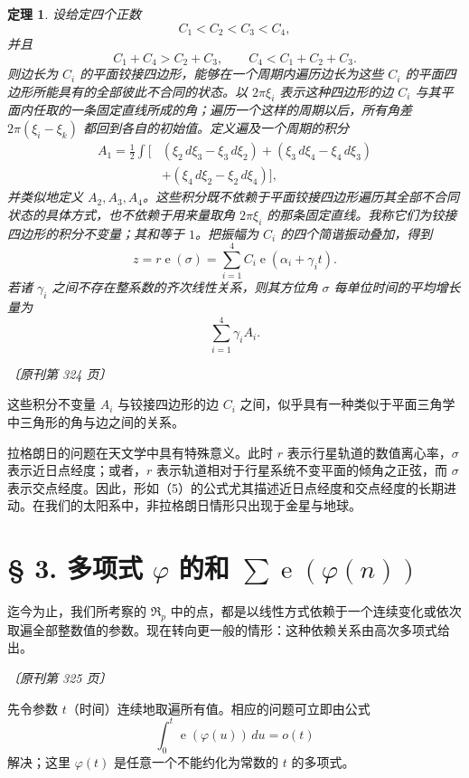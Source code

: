 \documentclass[UTF8,11pt,a4paper,fontset=none]{ctexart}
\theoremstyle{weylthm}
\newtheorem{theorem}{定理}
\newcommand{\e}{\operatorname{e}}
\newcommand{\origpage}[1]{%
  \par\vspace{0.7em}\noindent\hfill{\small\itshape〔原刊第 #1 页〕}\par\vspace{0.25em}}
\begin{document}
\begin{theorem}
设给定四个正数
\[
 C_1<C_2<C_3<C_4,
\]
并且
\[
 C_1+C_4>C_2+C_3,
 \qquad
 C_4<C_1+C_2+C_3.
\]
则边长为 \(C_i\) 的平面铰接四边形，能够在一个周期内遍历边长为这些
\(C_i\) 的平面四边形所能具有的全部彼此不合同的状态。以
\(2\pi\xi_i\) 表示这种四边形的边 \(C_i\) 与其平面内任取的一条固定直线所成的角；遍历一个这样的周期以后，所有角差
\(2\pi(\xi_i-\xi_k)\) 都回到各自的初始值。定义遍及一个周期的积分
\[
\begin{aligned}
 A_1=\frac12\int\bigl[&
   (\xi_2\,d\xi_3-\xi_3\,d\xi_2)
  +(\xi_3\,d\xi_4-\xi_4\,d\xi_3)\\
 &+(\xi_4\,d\xi_2-\xi_2\,d\xi_4)
 \bigr],
\end{aligned}
\]
并类似地定义 \(A_2,A_3,A_4\)。这些积分既不依赖于平面铰接四边形遍历其全部不合同状态的具体方式，也不依赖于用来量取角
\(2\pi\xi_i\) 的那条固定直线。我称它们为铰接四边形的\emph{积分不变量}；其和等于 \(1\)。把振幅为 \(C_i\) 的四个简谐振动叠加，得到
\[
 z=r\e(\sigma)=\sum_{i=1}^{4}C_i\e(\alpha_i+\gamma_i t).
\]
若诸 \(\gamma_i\) 之间不存在整系数的齐次线性关系，则其方位角 \(\sigma\) 每单位时间的平均增长量为
\[
 \sum_{i=1}^{4}\gamma_iA_i.
\]
\end{theorem}

\origpage{324}

这些积分不变量 \(A_i\) 与铰接四边形的边 \(C_i\) 之间，似乎具有一种类似于平面三角学中三角形的角与边之间的关系。

拉格朗日的问题在天文学中具有特殊意义。此时 \(r\) 表示行星轨道的数值离心率，\(\sigma\) 表示近日点经度；或者，\(r\) 表示轨道相对于行星系统不变平面的倾角之正弦，而 \(\sigma\) 表示交点经度。因此，形如（5）的公式尤其描述近日点经度和交点经度的长期进动。在我们的太阳系中，非拉格朗日情形只出现于金星与地球。

\section*{§ 3. 多项式 \(\varphi\) 的和 \(\sum \e(\varphi(n))\)}

迄今为止，我们所考察的 \(\mathfrak R_p\) 中的点，都是以线性方式依赖于一个连续变化或依次取遍全部整数值的参数。现在转向更一般的情形：这种依赖关系由高次多项式给出。

\origpage{325}

先令参数 \(t\)（时间）连续地取遍所有值。相应的问题可立即由公式
\begin{equation}
  \int_0^t \e(\varphi(u))\,du=o(t)
  \tag{8}
\end{equation}
解决；这里 \(\varphi(t)\) 是任意一个不能约化为常数的 \(t\) 的多项式。
\end{document}
